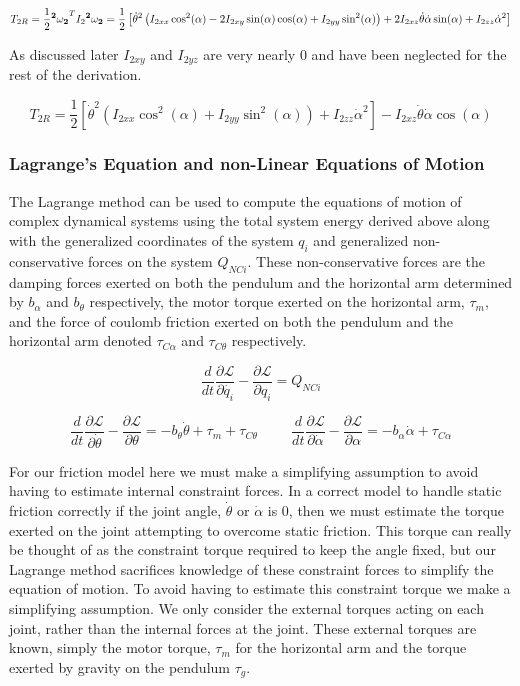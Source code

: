 \documentclass{article}
\newcommand{\xxx}[1]{\textcolor{red}{#1}}
\theoremstyle{plain}
\theoremstyle{definition}
\theoremstyle{remark}
\newcommand{\Lagr}{\mathcal{L}}
\begin{document}
$$ T_{2R} = \frac{1}{2} {\bf{^2\omega_{2}}}^T I_{2} {\bf{ ^2 \omega_{2}}} = \frac{1}{2} \left[ \dot{\theta}^2 \left(I_{2xx} \cos^2(\alpha) - 2 I_{2xy} \sin(\alpha)  \cos(\alpha) + I_{2yy}  \sin^2(\alpha)  \right) + 2 I_{2xz} \dot{\theta} \dot{\alpha} \sin(\alpha) + I_{2zz} \dot{\alpha}^2 \right]$$


As discussed later $I_{2xy}$ and $I_{2yz}$ are very nearly $0$ and have been neglected for the rest of the derivation.

$$T_{2R} = \frac{1}{2} \left[ \dot{\theta}^2 \left( I_{2xx} \cos^2(\alpha) + I_{2yy} \sin^2(\alpha) \right) + I_{2zz} \dot{\alpha}^2 \right] - I_{2xz} \dot{\theta} \dot{\alpha} \cos(\alpha) $$

\subsubsection*{Lagrange's Equation and non-Linear Equations of Motion}
The Lagrange method can be used to compute the equations of motion of complex dynamical systems using the total system energy derived above along with the generalized coordinates of the system $q_{i}$ and generalized non-conservative forces on the system $Q_{NCi}$.  These non-conservative forces are the damping forces exerted on both the pendulum and the horizontal arm determined by $b_\alpha$ and $b_\theta$ respectively,  the motor torque exerted on the horizontal arm, $\tau_{m}$, and the force of coulomb friction exerted on both the pendulum and the horizontal arm denoted $\tau_{C \alpha}$ and $\tau_{C \theta}$ respectively.  

$$ \frac{d}{dt} \frac{\partial \Lagr}{\partial \dot{q_i}} - \frac{\partial \Lagr}{\partial q_i} = Q_{NCi} $$

$$ \frac{d}{dt} \frac{\partial \Lagr}{\partial \dot{\theta}} - \frac{\partial \Lagr}{\partial \theta} = -b_{\theta} \dot{\theta} + \tau_m + \tau_{C \theta}  \hspace{1cm} \frac{d}{dt} \frac{\partial \Lagr}{\partial \dot{\alpha}} - \frac{\partial \Lagr}{\partial \alpha} = -b_{\alpha} \dot{\alpha} + \tau_{C \alpha} $$

For our friction model here we must make a simplifying assumption to avoid having to estimate internal constraint forces.  In a correct model to handle static friction correctly if the joint angle, $\dot{\theta}$ or $\dot{\alpha}$ is $0$, then we must estimate the torque exerted on the joint attempting to overcome static friction.  This torque can really be thought of as the constraint torque required to keep the angle fixed, but our Lagrange method sacrifices knowledge of these constraint forces to simplify the equation of motion.  To avoid having to estimate this constraint torque we make a simplifying assumption.  We only consider the external torques acting on each joint, rather than the internal forces at the joint.  These external torques are known, simply the motor torque, $\tau_m$ for the horizontal arm and the torque exerted by gravity on the pendulum $\tau_g$.
\end{document}
